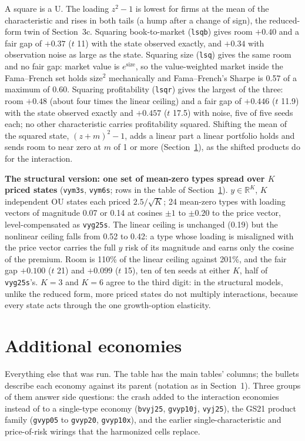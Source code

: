 \documentclass[11pt]{article}
\begin{document}
\noindent A square is a U. The loading $z^2-1$ is lowest for firms at the mean of the characteristic and rises in both tails (a hump after a change of sign), the reduced-form twin of Section~3c. Squaring book-to-market (\texttt{lsqb}) gives room $+0.40$ and a fair gap of $+0.37$ ($t$ 11) with the state observed exactly, and $+0.34$ with observation noise as large as the state. Squaring size (\texttt{lsq}) gives the same room and no fair gap: market value is $e^{\mathrm{size}}$, so the value-weighted market inside the Fama--French set holds $\mathrm{size}^2$ mechanically and Fama--French's Sharpe is 0.57 of a maximum of 0.60. Squaring profitability (\texttt{lsqr}) gives the largest of the three: room $+0.48$ (about four times the linear ceiling) and a fair gap of $+0.446$ ($t$ 11.9) with the state observed exactly and $+0.457$ ($t$ 17.5) with noise, five of five seeds each; no other characteristic carries profitability squared. Shifting the mean of the squared state, $(z+m)^2-1$, adds a linear part a linear portfolio holds and sends room to near zero at $m$ of 1 or more (Section~\ref{sec:appendix}), as the shifted products do for the interaction.

\noindent\textbf{The structural version: one set of mean-zero types spread over $K$ priced states} (\texttt{vym3s}, \texttt{vym6s}; rows in the table of Section~\ref{sec:appendix}). $y \in \mathbb{R}^K$, $K$ independent OU states each priced $2.5/\sqrt K$; 24 mean-zero types with loading vectors of magnitude 0.07 or 0.14 at cosines $\pm1$ to $\pm0.20$ to the price vector, level-compensated as \texttt{vyg25s}. The linear ceiling is unchanged (0.19) but the nonlinear ceiling falls from 0.52 to 0.42: a type whose loading is misaligned with the price vector carries the full $y$ risk of its magnitude and earns only the cosine of the premium. Room is 110\% of the linear ceiling against 201\%, and the fair gap $+0.100$ ($t$ 21) and $+0.099$ ($t$ 15), ten of ten seeds at either $K$, half of \texttt{vyg25s}'s. $K = 3$ and $K = 6$ agree to the third digit: in the structural models, unlike the reduced form, more priced states do not multiply interactions, because every state acts through the one growth-option elasticity.

\section{Additional economies}\label{sec:appendix}

Everything else that was run. The table has the main tables' columns; the bullets describe each economy against its parent (notation as in Section~1). Three groups of them answer side questions: the crash added to the interaction economies instead of to a single-type economy (\texttt{bvyj25}, \texttt{gvyp10j}, \texttt{vyj25}), the GS21 product family (\texttt{gvyp05} to \texttt{gvyp20}, \texttt{gvyp10x}), and the earlier single-characteristic and price-of-risk wirings that the harmonized cells replace.

\end{document}
